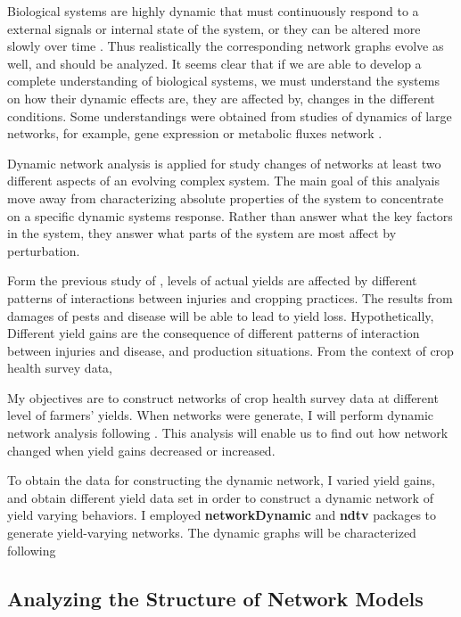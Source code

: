 Biological systems are highly dynamic that must continuously respond to a external signals or internal state of the system, or they can be altered more slowly over time . Thus realistically the corresponding network graphs evolve as well, and should be analyzed. It seems clear that if we are able to develop a complete understanding of biological systems, we must understand the systems on how their dynamic effects are, they are affected by, changes in the different conditions. Some understandings were obtained from studies of dynamics of large networks, for example, gene expression or metabolic fluxes network .

Dynamic network analysis is applied for study changes of networks at least two different aspects of an evolving complex system. The main goal of this analyais move away from characterizing absolute properties of the system to concentrate on a specific dynamic systems response. Rather than answer what the key factors in the system, they answer what parts of the system are most affect by perturbation.

Form the previous study of , levels of actual yields are affected by different patterns of interactions between injuries and cropping practices. The results from damages of pests and disease will be able to lead to yield loss. Hypothetically, Different yield gains are the consequence of different patterns of interaction between injuries and disease, and production situations.  From the context of crop health survey data, 

My objectives are to construct networks of crop health survey data at different level of farmers' yields. When networks were generate, I will perform dynamic network analysis following . This analysis will enable us to find out how network changed when yield gains decreased or increased.

To obtain the data for constructing the dynamic network, I varied yield gains, and obtain different yield data set in order to construct a dynamic network of yield varying behaviors. I employed \textbf{networkDynamic}  and \textbf{ndtv}  packages to generate yield-varying networks. The dynamic graphs will be characterized following 

\subsection*{Analyzing the Structure of Network Models}

